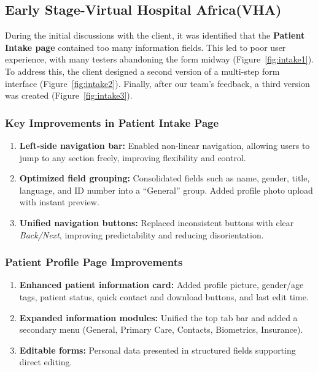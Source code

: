 \subsection{Early Stage-Virtual Hospital Africa(VHA)}
\label{subsec:subsec01}

During the initial discussions with the client, it was identified that the \textbf{Patient Intake page}
contained too many information fields. This led to poor user experience, with many testers
abandoning the form midway (Figure~\ref{fig:intake1}).
To address this, the client designed a second version of a multi-step form interface (Figure~\ref{fig:intake2}).
Finally, after our team's feedback, a third version was created (Figure~\ref{fig:intake3}).

\subsubsection{Key Improvements in Patient Intake Page}
\begin{enumerate}
    \item \textbf{Left-side navigation bar:} Enabled non-linear navigation, allowing users to jump to
    any section freely, improving flexibility and control.
    \item \textbf{Optimized field grouping:} Consolidated fields such as name, gender, title, language,
    and ID number into a ``General'' group. Added profile photo upload with instant preview.
    \item \textbf{Unified navigation buttons:} Replaced inconsistent buttons with clear
    \emph{Back/Next}, improving predictability and reducing disorientation.
\end{enumerate}

\subsubsection{Patient Profile Page Improvements}
\begin{enumerate}
    \item \textbf{Enhanced patient information card:} Added profile picture, gender/age tags, patient status,
    quick contact and download buttons, and last edit time.
    \item \textbf{Expanded information modules:} Unified the top tab bar and added a secondary menu
    (General, Primary Care, Contacts, Biometrics, Insurance).
    \item \textbf{Editable forms:} Personal data presented in structured fields supporting direct editing.
\end{enumerate}

